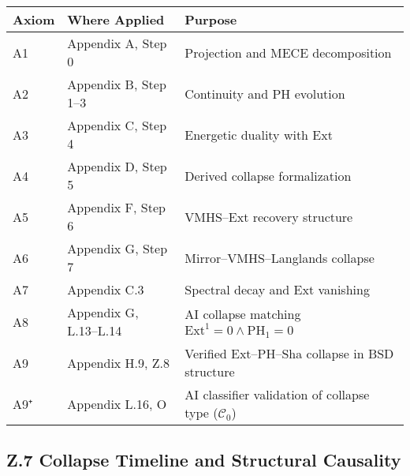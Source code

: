 \documentclass[11pt]{article}
\begin{document}
\begin{axiom}
\begin{axiom}
{{\begin{tabular}{lll}
\textbf{Axiom} & \textbf{Where Applied} & \textbf{Purpose} \\
\hline
A1 & Appendix A, Step 0 & Projection and MECE decomposition \\
A2 & Appendix B, Step 1–3 & Continuity and PH evolution \\
A3 & Appendix C, Step 4 & Energetic duality with Ext \\
A4 & Appendix D, Step 5 & Derived collapse formalization \\
A5 & Appendix F, Step 6 & VMHS–Ext recovery structure \\
A6 & Appendix G, Step 7 & Mirror–VMHS–Langlands collapse \\
A7 & Appendix C.3 & Spectral decay and Ext vanishing \\
A8 & Appendix G, L.13–L.14 & AI collapse matching \( \mathrm{Ext}^1 = 0 \land \mathrm{PH}_1 = 0 \) \\
A9 & Appendix H.9, Z.8 & Verified Ext–PH–Sha collapse in BSD structure \\
A9⁺ & Appendix L.16, O & AI classifier validation of collapse type (\( \mathcal{C}_0 \)) \\
\end{tabular}


\subsection*{Z.7 Collapse Timeline and Structural Causality}

\begin{center}
\end{center}

\vspace{1em}

}}
\end{axiom}
\end{axiom}
\end{document}
